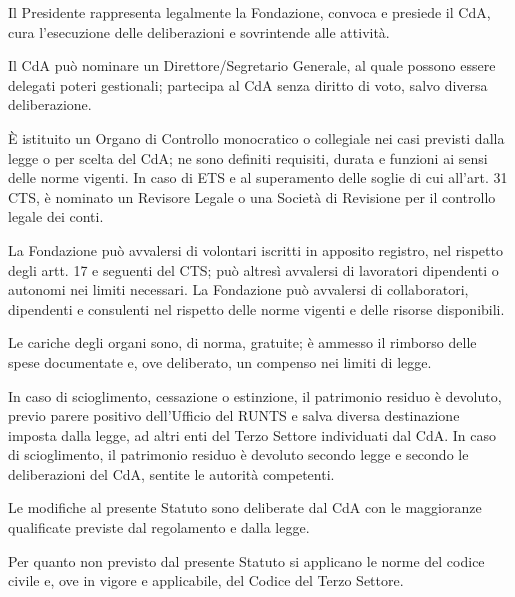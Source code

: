  Il Presidente rappresenta legalmente la Fondazione, convoca e presiede il CdA, cura l'esecuzione delle deliberazioni e sovrintende alle attività.

 Il CdA può nominare un Direttore/Segretario Generale, al quale possono essere delegati poteri gestionali; partecipa al CdA senza diritto di voto, salvo diversa deliberazione.

 È istituito un Organo di Controllo monocratico o collegiale nei casi previsti dalla legge o per scelta del CdA; ne sono definiti requisiti, durata e funzioni ai sensi delle norme vigenti.
\ifETS
{} In caso di ETS e al superamento delle soglie di cui all'art. 31 CTS, è nominato un Revisore Legale o una Società di Revisione per il controllo legale dei conti.
\fi

\ifETS
{} La Fondazione può avvalersi di volontari iscritti in apposito registro, nel rispetto degli artt. 17 e seguenti del CTS; può altresì avvalersi di lavoratori dipendenti o autonomi nei limiti necessari.
\else
{} La Fondazione può avvalersi di collaboratori, dipendenti e consulenti nel rispetto delle norme vigenti e delle risorse disponibili.
\fi

 Le cariche degli organi sono, di norma, gratuite; è ammesso il rimborso delle spese documentate e, ove deliberato, un compenso nei limiti di legge.

\ifETS
{} In caso di scioglimento, cessazione o estinzione, il patrimonio residuo è devoluto, previo parere positivo dell'Ufficio del RUNTS e salva diversa destinazione imposta dalla legge, ad altri enti del Terzo Settore individuati dal CdA.
\else
{} In caso di scioglimento, il patrimonio residuo è devoluto secondo legge e secondo le deliberazioni del CdA, sentite le autorità competenti.
\fi

 Le modifiche al presente Statuto sono deliberate dal CdA con le maggioranze qualificate previste dal regolamento e dalla legge.

 Per quanto non previsto dal presente Statuto si applicano le norme del codice civile e, ove in vigore e applicabile, del Codice del Terzo Settore.

\vspace{2\baselineskip}
\DataLuogo{\FondazioneCitta}{\today}

